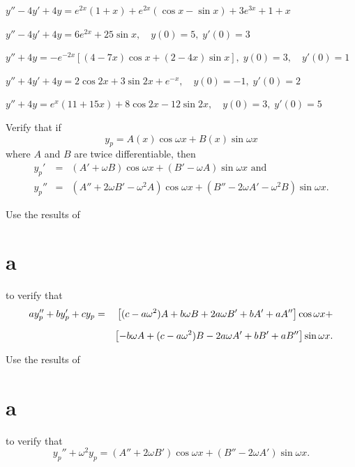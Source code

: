 \begin{exerciselist}
  \item\label{exer:5.5.31} $y''-4y'+4y=e^{2x}(1+x)+e^{2x}(\cos x-\sin x)+3e^{3x}+1+x$

  \item\label{exer:5.5.32} $y''-4y'+4y=6e^{2x}+25\sin x,\quad y(0)=5,\;y'(0)=3$


  \item\label{exer:5.5.33} \CGex
        $y''+4y=-e^{-2x}\left[(4-7x)\cos x+(2-4x)\sin x\right], \;y(0)=3,\quad y'(0)=1$

  \item\label{exer:5.5.34} \CGex $y''+4y'+4y=2\cos2x+3\sin2x+e^{-x},\quad y(0)=-1,\;y'(0)=2$

  \item\label{exer:5.5.35} \CGex $y''+4y=e^{x}(11+15x)+8\cos2x-12\sin2x,\quad y(0)=3,\;y'(0)=5$

  \item\label{exer:5.5.36}
  \begin{alist}
    \item %
    Verify that if
    \[
      y_{p}=A(x)\cos\omega x+B(x)\sin\omega x
    \]
    where $A$ and $B$ are twice differentiable, then
    \begin{eqnarray*}
      y_{p}'  & = & (A'+\omega B)\cos\omega x+(B'-\omega A)\sin\omega x\mbox{ and} \\
      y_{p}'' & = & (A''+2\omega B'-\omega^{2}A)\cos\omega x+(B''-2\omega A'-\omega^{2}B)\sin\omega x.
    \end{eqnarray*}

    \item %
    Use the results of \part{a} to verify that
    \begin{eqnarray*}
      ay_{p}''+by_{p}'+cy_{p} & = & \left[(c-a\omega^{2})A+b\omega B+2a\omega B'+bA'+aA''\right]\cos\omega x+ \\[2\jot]
                              &   & \left[-b\omega A+(c-a\omega^{2})B-2a\omega A'+bB'+aB''\right]\sin\omega x.
    \end{eqnarray*}

    \item %
    Use the results of \part{a} to verify that
    \[
      y_{p}''+\omega^{2}y_{p}=(A''+2\omega B')\cos\omega x+ (B''-2\omega A')\sin\omega x.
    \]


\end{alist}
\end{exerciselist}
